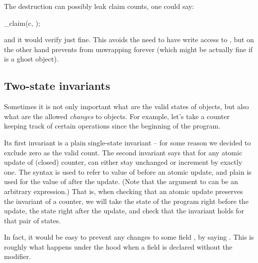\begin{note}
The destruction can possibly leak claim counts, \ie one could say:
\begin{VCC}
\destroy_claim(c, {});
\end{VCC}
\noindent
and it would verify just fine.
This avoids the need to have write access to , but on the other hand prevents
 from unwrapping forever (which might be actually fine if  is a ghost object).
\end{note}

\subsection{Two-state invariants}
\label{sect:inv2}

Sometimes it is not only important what are the valid states of objects,
but also what are the allowed \emph{changes} to objects.
For example, let's take a counter keeping track of certain operations
since the beginning of the program.


\noindent
Its first invariant is a plain single-state invariant -- for some reason
we decided to exclude zero as the valid count.
The second invariant says that for any atomic update of (closed)
counter,  can either stay unchanged or increment by exactly one.
The syntax  is used to refer to value of  before
an atomic update, and plain  is used for the value of 
after the update.
(Note that the argument to  can be an arbitrary expression.)
That is, when checking that an atomic update preserves the invariant
of a counter, we will take the state of the program right
before the update, the state right after the update, and check
that the invariant holds for that pair of states.

\begin{note}
In fact, it would be easy to prevent any changes to some field , by
saying .
This is roughly what happens under the hood when a field is
declared without the  modifier.
\end{note}

